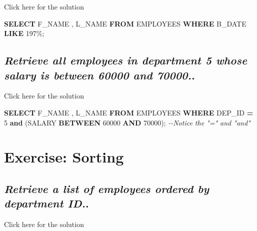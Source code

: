 \documentclass[
]{book}
\newenvironment{Shaded}{\begin{snugshade}}{\end{snugshade}}
\newcommand{\CommentTok}[1]{\textcolor[rgb]{0.56,0.35,0.01}{\textit{#1}}}
\newcommand{\DecValTok}[1]{\textcolor[rgb]{0.00,0.00,0.81}{#1}}
\newcommand{\KeywordTok}[1]{\textcolor[rgb]{0.13,0.29,0.53}{\textbf{#1}}}
\newcommand{\NormalTok}[1]{#1}
\newcommand{\OperatorTok}[1]{\textcolor[rgb]{0.81,0.36,0.00}{\textbf{#1}}}
\newcommand{\StringTok}[1]{\textcolor[rgb]{0.31,0.60,0.02}{#1}}
\begin{document}
Click here for the solution

\begin{Shaded}
\begin{Highlighting}[]
\KeywordTok{SELECT}\NormalTok{ F\_NAME , L\_NAME}
\KeywordTok{FROM}\NormalTok{ EMPLOYEES}
\KeywordTok{WHERE}\NormalTok{ B\_DATE }\KeywordTok{LIKE} \StringTok{\textquotesingle{}197\%\textquotesingle{}}\NormalTok{;}
\end{Highlighting}
\end{Shaded}

\hypertarget{retrieve-all-employees-in-department-5-whose-salary-is-between-60000-and-70000..}{%
\subsection{\texorpdfstring{\emph{Retrieve all employees in department 5 whose salary is between 60000 and 70000.}.}{Retrieve all employees in department 5 whose salary is between 60000 and 70000..}}\label{retrieve-all-employees-in-department-5-whose-salary-is-between-60000-and-70000..}}

Click here for the solution

\begin{Shaded}
\begin{Highlighting}[]
\KeywordTok{SELECT}\NormalTok{ F\_NAME , L\_NAME}
\KeywordTok{FROM}\NormalTok{ EMPLOYEES}
\KeywordTok{WHERE}\NormalTok{ DEP\_ID }\OperatorTok{=} \DecValTok{5} \KeywordTok{and}\NormalTok{ (SALARY }\KeywordTok{BETWEEN} \DecValTok{60000} \KeywordTok{AND} \DecValTok{70000}\NormalTok{);}
\CommentTok{{-}{-}Notice the "=" and "and"}
\end{Highlighting}
\end{Shaded}

\hypertarget{exercise-sorting}{%
\section{Exercise: Sorting}\label{exercise-sorting}}

\hypertarget{retrieve-a-list-of-employees-ordered-by-department-id..}{%
\subsection{\texorpdfstring{\emph{Retrieve a list of employees ordered by department ID.}.}{Retrieve a list of employees ordered by department ID..}}\label{retrieve-a-list-of-employees-ordered-by-department-id..}}

Click here for the solution
\end{document}
